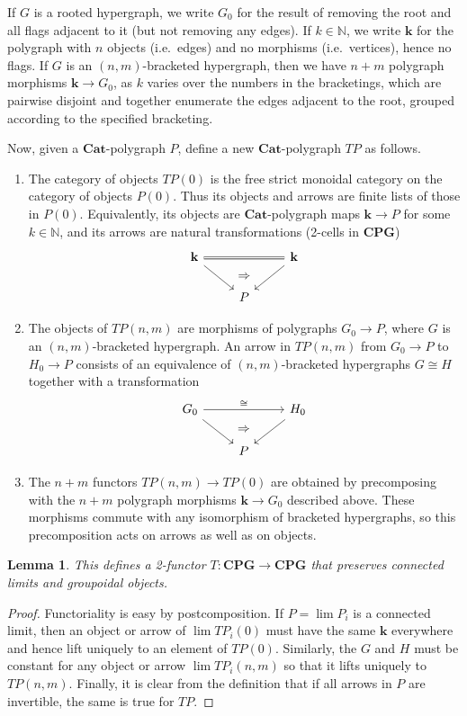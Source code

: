 \documentclass{article}
\newtheorem{lem}[thm]{Lemma}
\theoremstyle{definition}
\theoremstyle{remark}
\def\Cat{\ensuremath{\mathbf{Cat}}}
\def\cpg{\ensuremath{\mathbf{CPG}}\xspace}
\def\N{\mathbb{N}}
\begin{document}
If $G$ is a rooted hypergraph, we write $G_0$ for the result of removing the root and all flags adjacent to it (but not removing any edges).
If $k\in\N$, we write $\mathbf{k}$ for the polygraph with $n$ objects (i.e.\ edges) and no morphisms (i.e.\ vertices), hence no flags.
If $G$ is an $(n,m)$-bracketed hypergraph, then we have $n+m$ polygraph morphisms $\mathbf{k}\to G_0$, as $k$ varies over the numbers in the bracketings, which are pairwise disjoint and together enumerate the edges adjacent to the root, grouped according to the specified bracketing.

Now, given a \Cat-polygraph $P$, define a new \Cat-polygraph $T P$ as follows.
\begin{enumerate}
\item The category of objects $T P(0)$ is the free strict monoidal category on the category of objects $P(0)$.
  Thus its objects and arrows are finite lists of those in $P(0)$.
  Equivalently, its objects are \Cat-polygraph maps $\mathbf{k}\to P$ for some $k\in\N$, and its arrows are natural transformations (2-cells in \cpg)
  \[
  \begin{tikzcd}
    \mathbf{k} \ar[rr,equals] \ar[dr] & ~ \ar[d,phantom,"\Rightarrow"] & \mathbf{k} \ar[dl] \\ & P
  \end{tikzcd}
  \]
\item The objects of $TP(n,m)$ are morphisms of polygraphs $G_0\to P$, where $G$ is an $(n,m)$-bracketed hypergraph.
  An arrow in $TP(n,m)$ from $G_0\to P$ to $H_0\to P$ consists of an equivalence of $(n,m)$-bracketed hypergraphs $G\cong H$ together with a transformation
  \[
  \begin{tikzcd}
    G_0 \ar[rr,"\cong"] \ar[dr] & ~ \ar[d,phantom,"\Rightarrow"] & H_0 \ar[dl] \\ & P
  \end{tikzcd}
  \]
\item The $n+m$ functors $TP(n,m) \to TP(0)$ are obtained by precomposing with the $n+m$ polygraph morphisms $\mathbf{k}\to G_0$ described above.
  These morphisms commute with any isomorphism of bracketed hypergraphs, so this precomposition acts on arrows as well as on objects.
\end{enumerate}

\begin{lem}
  This defines a 2-functor $T:\cpg\to\cpg$ that preserves connected limits and groupoidal objects.
\end{lem}
\begin{proof}
  Functoriality is easy by postcomposition.
  If $P = \lim P_i$ is a connected limit, then an object or arrow of $\lim T P_i(0)$ must have the same $\mathbf{k}$ everywhere and hence lift uniquely to an element of $T P(0)$.
  Similarly, the $G$ and $H$ must be constant for any object or arrow $\lim T P_i(n,m)$ so that it lifts uniquely to $T P (n,m)$.
  Finally, it is clear from the definition that if all arrows in $P$ are invertible, the same is true for $TP$.
\end{proof}
\end{document}
